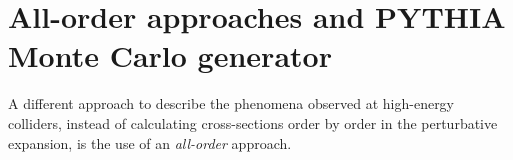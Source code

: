 	

\section{All-order approaches and PYTHIA Monte Carlo generator}

A different approach to describe the phenomena observed at high-energy colliders, instead of calculating cross-sections order by order in the perturbative expansion, is the use of an \textit{all-order} approach. 
\\
%
